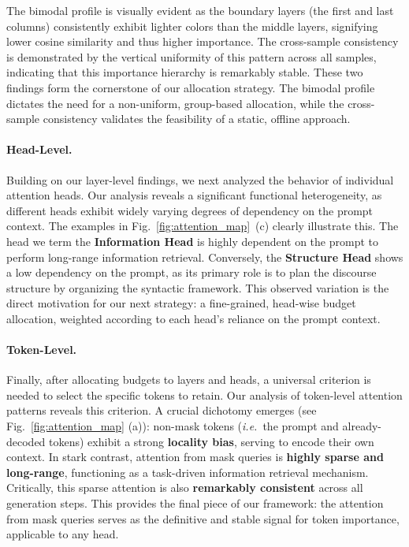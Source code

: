 The bimodal profile is visually evident as the boundary layers (the first and last columns) consistently exhibit lighter colors than the middle layers, signifying lower cosine similarity and thus higher importance. The cross-sample consistency is demonstrated by the vertical uniformity of this pattern across all samples, indicating that this importance hierarchy is remarkably stable.
These two findings form the cornerstone of our allocation strategy. The bimodal profile dictates the need for a non-uniform, group-based allocation, while the cross-sample consistency validates the feasibility of a static, offline approach.

\paragraph{Head-Level.}
Building on our layer-level findings, we next analyzed the behavior of individual attention heads. Our analysis reveals a significant functional heterogeneity, as different heads exhibit widely varying degrees of dependency on the prompt context. The examples in Fig.~\ref{fig:attention_map}~(c) clearly illustrate this. The head we term the \textbf{Information Head} is highly dependent on the prompt to perform long-range information retrieval. Conversely, the \textbf{Structure Head} shows a low dependency on the prompt, as its primary role is to plan the discourse structure by organizing the syntactic framework. This observed variation is the direct motivation for our next strategy: a fine-grained, head-wise budget allocation, weighted according to each head's reliance on the prompt context.

\paragraph{Token-Level.}
Finally, after allocating budgets to layers and heads, a universal criterion is needed to select the specific tokens to retain. Our analysis of token-level attention patterns reveals this criterion. A crucial dichotomy emerges (see Fig.~\ref{fig:attention_map} (a)): non-mask tokens (\textit{i.e.}\, the prompt and already-decoded tokens) exhibit a strong \textbf{locality bias}, serving to encode their own context. In stark contrast, attention from mask queries is \textbf{highly sparse and long-range}, functioning as a task-driven information retrieval mechanism. Critically, this sparse attention is also \textbf{remarkably consistent} across all generation steps. This provides the final piece of our framework: the attention from mask queries serves as the definitive and stable signal for token importance, applicable to any head.


